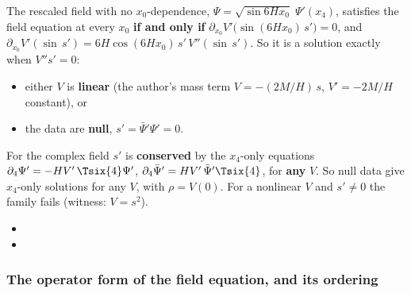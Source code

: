 The rescaled field with no $x_0$-dependence, $\Psi=\sqrt{\sin 6Hx_0}\;\Psi'(x_4)$, satisfies the field
equation at every $x_0$ \textbf{if and only if} $\partial_{x_0}V'\bigl(\sin(6Hx_0)\,s'\bigr)=0$, and
$\partial_{x_0}V'(\sin\,s')=6H\cos(6Hx_0)\,s'\,V''(\sin\,s')$. So it is a solution exactly when
$V''s'=0$:
\begin{itemize}
  \item either $V$ is \textbf{linear} (the author's mass term $V=-(2M/H)\,s$, $V'=-2M/H$ constant), or
  \item the data are \textbf{null}, $s'=\bar\Psi'\Psi'=0$.
\end{itemize}
For the complex field $s'$ is \textbf{conserved} by the $x_4$-only equations
$\partial_4\Psi'=-HV'\,\Tsix{4}\Psi'$, $\partial_4\bar\Psi'=HV'\,\bar\Psi'\Tsix{4}$, for \textbf{any}
$V$. So null data give $x_4$-only solutions for any $V$, with $\rho=V(0)$. For a nonlinear $V$ and
$s'\neq0$ the family fails (witness: $V=s^2$). 
\begin{itemize}
  \item {}
  \item {}
\end{itemize}

\subsubsection{The operator form of the field equation, and its ordering}
\label{sec:3.4.9}

